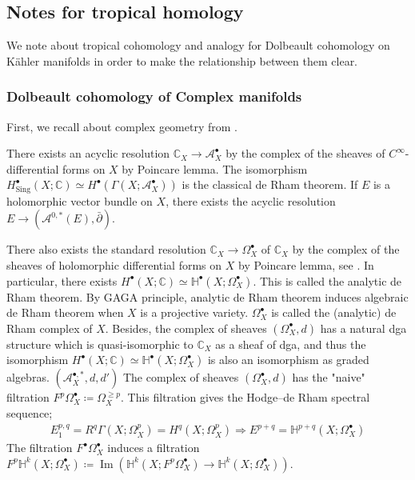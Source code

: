 \documentclass[a4paper,dvipdfmx,reqno,12pt]{amsart}
\theoremstyle{definition}
\newcommand{\deq}{\coloneqq}
\newcommand{\C}{\mathbb{C}}%
\newcommand{\mb}[1]{\mathbb{#1}}%
\newcommand{\mcal}[1]{\mathcal{#1}}%
\newcommand{\opn}[1]{\operatorname{#1}}
\numberwithin{equation}{section}
\begin{document}
\subsection{Notes for tropical homology}
We note about tropical cohomology and analogy for Dolbeault
cohomology on K\"ahler manifolds in order to make
the relationship between them clear.

\subsubsection{Dolbeault cohomology of Complex manifolds}

First, we recall about complex geometry from \cite{MR2093043,MR2451566}.


There exists an acyclic resolution $\C_X \to \mcal{A}_X^{\bullet}$
by the complex of the sheaves of $C^{\infty}$-differential forms
on $X$ by Poincare lemma.
The isomorphism $H^{\bullet}_{\opn{Sing}}(X;\C)
  \simeq H^{\bullet}(\Gamma(X;\mcal{A}_X^{\bullet}))$ is the classical
de Rham theorem.
If $E$ is a holomorphic vector bundle on $X$, there exists
the acyclic resolution
$E\to (\mcal{A}^{0,*}(E),\bar{\partial})$.

There also exists the standard resolution $\C_X \to \Omega^{\bullet}_X$ of
$\C_X$ by the complex of the sheaves of holomorphic differential forms
on $X$ by Poincare lemma, see \cite[Lemma 8.13]{MR2451566}.
In particular, there exists
$H^{\bullet}(X;\C)\simeq \mb{H}^{\bullet}(X;\Omega^{\bullet}_X)$.
This is called the analytic de Rham theorem. By GAGA principle, analytic
de Rham theorem induces algebraic de Rham theorem when $X$
is a projective variety.
$\Omega_X^{\bullet}$ is called the (analytic) de Rham complex of $X$.
Besides, the complex of sheaves $(\Omega_X^{\bullet},d)$ has
a natural dga structure which is
quasi-isomorphic to $\C_X$ as a sheaf of dga, and thus the isomorphism
$H^{\bullet}(X;\C)\simeq \mb{H}^{\bullet}(X;\Omega^{\bullet}_X)$ is
also an isomorphism as graded algebras.
$(\mcal{A}_{X}^{\bullet,*},d,d')$
The complex of sheaves $(\Omega_X^{\bullet},d)$ has
the "naive" filtration
$F^{p}\Omega_X^{\bullet}\deq \Omega_X^{\geq p}$.
This filtration gives the Hodge--de Rham spectral sequence;
\begin{align}
  E_{1}^{p,q}=R^{q}\Gamma(X;\Omega_X^{p})=H^{q}(X;\Omega_X^{p})
  \Rightarrow E^{p+q}=\mb{H}^{p+q}(X;\Omega_X^{\bullet})
\end{align}
The filtration $F^{\bullet}\Omega_X^{\bullet}$ induces a filtration
$F^{p}\mb{H}^{k}(X;\Omega_X^{\bullet})\deq
  \opn{Im}(\mb{H}^{k}(X;F^{p}\Omega_X^{\bullet})
  \to \mb{H}^{k}(X;\Omega_X^{\bullet}))$.
\end{document}
